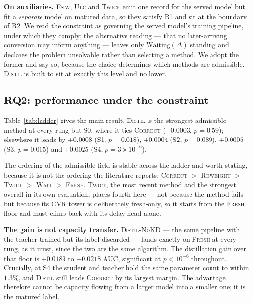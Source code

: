 \documentclass[runningheads]{llncs}
\begin{document}
\smallskip\noindent\textbf{On auxiliaries.} \textsc{Fsiw}, \textsc{Ulc} and \textsc{Twice} emit one
record for the served model but fit a \emph{separate} model on matured data, so they satisfy R1 and
sit at the boundary of R2. We read the constraint as governing the served model's training pipeline,
under which they comply; the alternative reading --- that no later-arriving conversion may inform
anything --- leaves only $\mathrm{Waiting}(\Delta)$ standing and declares the problem unsolvable
rather than selecting a method. We adopt the former and say so, because the choice determines which
methods are admissible. \textsc{Distil} is built to sit at exactly this level and no lower.

\subsection{RQ2: performance under the constraint}\label{sec:main}

\begin{table}[t]
\caption{AUC across the serving-capacity ladder, $v=7$\,d, five seeds. Significance on
\textsc{Distil} is against \textsc{Correct}, the strongest prior admissible method, paired over
matched seeds}
\label{tab:ladder}
\centering\small

\end{table}

Table~\ref{tab:ladder} gives the main result. \textsc{Distil} is the strongest admissible method at
every rung but S0, where it ties \textsc{Correct} ($-0.0003$, $p=0.59$); elsewhere it leads by
$+0.0008$ (S1, $p=0.018$), $+0.0004$ (S2, $p=0.089$), $+0.0005$ (S3, $p=0.005$) and $+0.0025$ (S4,
$p=3\!\times\!10^{-6}$).

The ordering of the admissible field is stable across the ladder and worth stating, because it is
not the ordering the literature reports: \textsc{Correct} $>$ \textsc{Reweight} $>$ \textsc{Twice}
$>$ \textsc{Wait} $>$ \textsc{Fresh}. \textsc{Twice}, the most recent method and the strongest
overall in its own evaluation, places fourth here --- not because the method fails but because its
CVR tower is deliberately fresh-only, so it starts from the \textsc{Fresh} floor and must climb back
with its delay head alone.

\smallskip\noindent\textbf{The gain is not capacity transfer.} \textsc{Distil-NoKD} --- the same
pipeline with the teacher trained but its label discarded --- lands exactly on \textsc{Fresh} at
every rung, as it must, since the two are the same algorithm. The distillation gain over that floor
is $+0.0189$ to $+0.0218$ AUC, significant at $p<10^{-6}$ throughout. Crucially, at S4 the student
and teacher hold the same parameter count to within $1.3\%$, and \textsc{Distil} still leads
\textsc{Correct} by its largest margin. The advantage therefore cannot be capacity flowing from a
larger model into a smaller one; it is the matured label.
\end{document}
